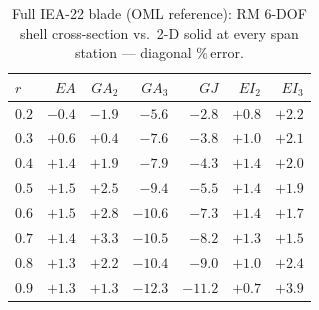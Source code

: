 \begin{table}[t]\centering\small
\caption{Full IEA-22 blade (OML reference): RM 6-DOF shell cross-section vs.\ 2-D solid at every span station --- diagonal \%\,error.}\label{tab:fullblade}
\begin{tabular}{lrrrrrr}
\toprule
$r$ & $EA$ & $GA_2$ & $GA_3$ & $GJ$ & $EI_2$ & $EI_3$\\
\midrule
$0.2$ & $-0.4$ & $-1.9$ & $-5.6$ & $-2.8$ & $+0.8$ & $+2.2$\\
$0.3$ & $+0.6$ & $+0.4$ & $-7.6$ & $-3.8$ & $+1.0$ & $+2.1$\\
$0.4$ & $+1.4$ & $+1.9$ & $-7.9$ & $-4.3$ & $+1.4$ & $+2.0$\\
$0.5$ & $+1.5$ & $+2.5$ & $-9.4$ & $-5.5$ & $+1.4$ & $+1.9$\\
$0.6$ & $+1.5$ & $+2.8$ & $-10.6$ & $-7.3$ & $+1.4$ & $+1.7$\\
$0.7$ & $+1.4$ & $+3.3$ & $-10.5$ & $-8.2$ & $+1.3$ & $+1.5$\\
$0.8$ & $+1.3$ & $+2.2$ & $-10.4$ & $-9.0$ & $+1.0$ & $+2.4$\\
$0.9$ & $+1.3$ & $+1.3$ & $-12.3$ & $-11.2$ & $+0.7$ & $+3.9$\\
\bottomrule
\end{tabular}
\end{table}